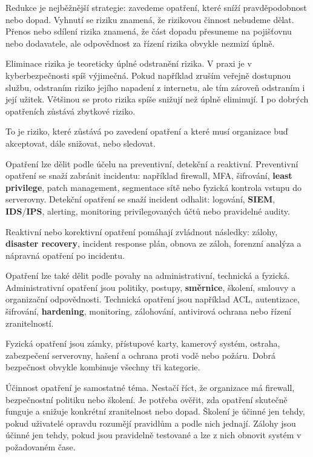 \documentclass[11pt,a4paper]{article}
\begin{document}
Redukce je nejběžnější strategie: zavedeme opatření, které sníží pravděpodobnost nebo dopad. Vyhnutí se riziku znamená, že rizikovou činnost nebudeme dělat. Přenos nebo sdílení rizika znamená, že část dopadu přesuneme na pojišťovnu nebo dodavatele, ale odpovědnost za řízení rizika obvykle nezmizí úplně.

Eliminace rizika je teoreticky úplné odstranění rizika. V praxi je v kyberbezpečnosti spíš výjimečná. Pokud například zruším veřejně dostupnou službu, odstraním riziko jejího napadení z internetu, ale tím zároveň odstraním i její užitek. Většinou se proto rizika spíše snižují než úplně eliminují. I po dobrých opatřeních zůstává zbytkové riziko.

To je riziko, které zůstává po zavedení opatření a které musí organizace buď akceptovat, dále snižovat, nebo sledovat.

Opatření lze dělit podle účelu na preventivní, detekční a reaktivní. Preventivní opatření se snaží zabránit incidentu: například firewall, MFA, šifrování, \textbf{least privilege}, patch management, segmentace sítě nebo fyzická kontrola vstupu do serverovny. Detekční opatření se snaží incident odhalit: logování, \textbf{SIEM}, \textbf{IDS}/\textbf{IPS}, alerting, monitoring privilegovaných účtů nebo pravidelné audity.

Reaktivní nebo korektivní opatření pomáhají zvládnout následky: zálohy, \textbf{disaster recovery}, incident response plán, obnova ze záloh, forenzní analýza a nápravná opatření po incidentu.

Opatření lze také dělit podle povahy na administrativní, technická a fyzická. Administrativní opatření jsou politiky, postupy, \textbf{směrnice}, školení, smlouvy a organizační odpovědnosti. Technická opatření jsou například ACL, autentizace, šifrování, \textbf{hardening}, monitoring, zálohování, antivirová ochrana nebo řízení zranitelností.

Fyzická opatření jsou zámky, přístupové karty, kamerový systém, ostraha, zabezpečení serverovny, hašení a ochrana proti vodě nebo požáru. Dobrá bezpečnost obvykle kombinuje všechny tři kategorie.

Účinnost opatření je samostatné téma. Nestačí říct, že organizace má firewall, bezpečnostní politiku nebo školení. Je potřeba ověřit, zda opatření skutečně funguje a snižuje konkrétní zranitelnost nebo dopad. Školení je účinné jen tehdy, pokud uživatelé opravdu rozumějí pravidlům a podle nich jednají. Zálohy jsou účinné jen tehdy, pokud jsou pravidelně testované a lze z nich obnovit systém v požadovaném čase.
\end{document}
